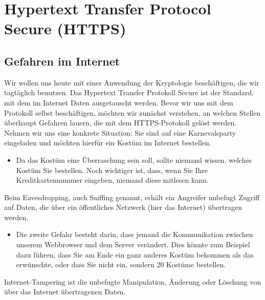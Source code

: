 \chapter{Hypertext Transfer Protocol Secure (HTTPS)}\label{ch:05}

\lstset{style=Python}

    \section{Gefahren im Internet}\label{sec:EinführungHTTPS} 
        Wir wollen uns heute mit einer Anwendung der Kryptologie beschäftigen, die wir tagtäglich benutzen. Das Hypertext Transfer Protokoll Secure ist der Standard, mit dem im Internet Daten ausgetauscht werden. Bevor wir uns mit dem Protokoll selbst beschäftigen, möchten wir zunächst verstehen, an welchen Stellen überhaupt Gefahren lauern, die mit dem HTTPS-Protokoll gelöst werden. Nehmen wir uns eine konkrete Situation: Sie sind auf eine Karnevalsparty eingeladen und möchten hierfür ein Kostüm im Internet bestellen.

        \begin{itemize} 
            \item [\emoji{warning}] Da das Kostüm eine Überraschung sein soll, sollte niemand wissen, welches Kostüm Sie bestellen. Noch wichtiger ist, dass, wenn Sie Ihre Kreditkartennummer eingeben, niemand diese mitlesen kann.
        \end{itemize}

        \begin{mydefinition}
            Beim Eavesdropping, auch Sniffing genannt, erhält ein Angreifer unbefugt Zugriff auf Daten, die über ein öffentliches Netzwerk (hier das Internet) übertragen werden. 
        \end{mydefinition}

        \begin{itemize} 
            \item [\emoji{warning}] Die zweite Gefahr besteht darin, dass jemand die Kommunikation zwischen unserem Webbrowser und dem Server verändert. Dies könnte zum Beispiel dazu führen, dass Sie am Ende ein ganz anderes Kostüm bekommen als das erwünschte, oder dass Sie nicht ein, sondern 20 Kostüme bestellen.
        \end{itemize}

        \begin{mydefinition}[Tampering] 
            Internet-Tampering ist die unbefugte Manipulation, Änderung oder Löschung von über das Internet übertragenen Daten.
        \end{mydefinition}

